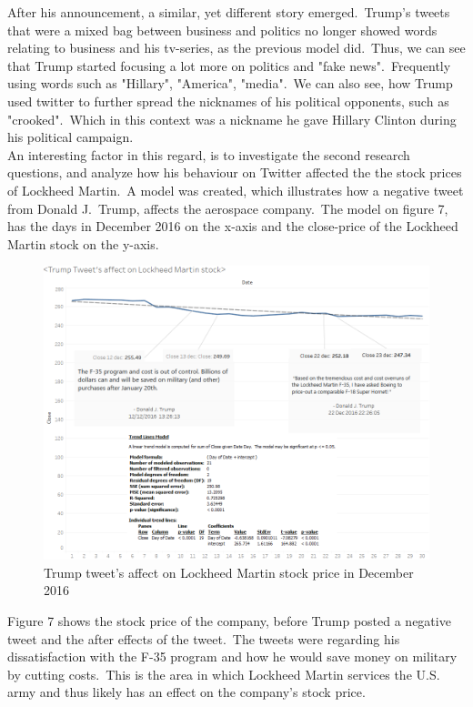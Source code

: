 \documentclass[12pt]{article}
\begin{document}
After his announcement, a similar, yet different story emerged.\ Trump's tweets that were a mixed bag between business and politics no longer showed words relating to business and his tv-series,  as the  previous model did.\ Thus, we can see that Trump started focusing a lot more on politics and "fake news".\ Frequently using words such as "Hillary", "America", "media".\ We can also see, how Trump used twitter to further spread the nicknames of his political opponents, such as "crooked".\ Which in this context was a nickname he gave Hillary Clinton during his political campaign.\\

An interesting factor in this regard, is to investigate the second research questions, and analyze how his behaviour on Twitter affected the the stock prices of Lockheed Martin.\  A model was created, which illustrates how a negative tweet from Donald J.\ Trump, affects the aerospace company.\ The model on figure 7, has the days in December 2016 on the x-axis and the close-price of the Lockheed Martin stock on the y-axis.

\begin{figure}[H] %
	\centering %
\includegraphics [scale= .45]  {lockfinal.png}    %
	\caption[Optional caption] {Trump tweet's affect on Lockheed Martin stock price in December 2016}
	\label{fig:wordcloudBliz}

\end{figure}

Figure 7 shows the stock price of the company, before Trump posted a negative tweet and the after effects of the tweet.\ The tweets were regarding his dissatisfaction with the F-35 program and how he would save money on military by cutting costs.\ This is the area in which Lockheed Martin services the U.S. army and thus likely has an effect on the company's stock price. \\
\end{document}
